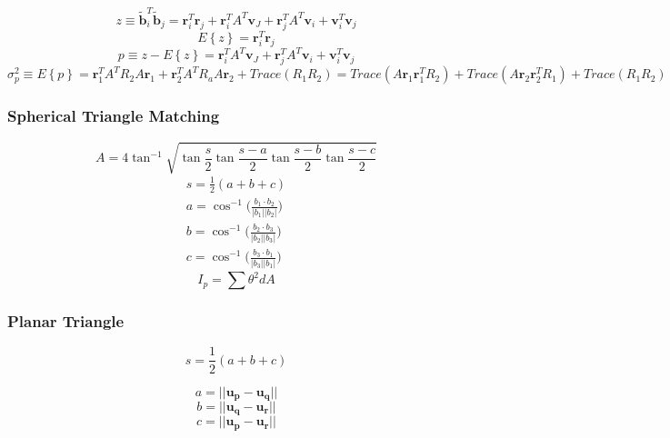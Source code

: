 \documentclass[12pt,a4paper,oneside]{article}
\begin{document}
\begin{equation}
z \equiv \tilde{\bm{b}}_i^T\tilde{\bm{b}}_j = \bm{r}_i^T\bm{r}_j + \bm{r}_i^TA^T\bm{v}_J + \bm{r}_j^TA^T\bm{v}_i + \bm{v}_i^T\bm{v}_j
\end{equation}
\begin{equation}
E\left\{z\right\} = \bm{r}_i^T\bm{r}_j
\end{equation}
\begin{equation}
p \equiv z - E\left\{z\right\} = \bm{r}_i^TA^T\bm{v}_J + \bm{r}_j^TA^T\bm{v}_i + \bm{v}_i^T\bm{v}_j
\end{equation}
\begin{equation}
\sigma_p^2 \equiv E\left\{p\right\} = \bm{r}_1^TA^TR_2A\bm{r}_1 + \bm{r}_2^TA^TR_aA\bm{r}_2 + Trace(R_1R_2) = Trace(A\bm{r}_1\bm{r}_1^TR_2) + Trace(A\bm{r}_2\bm{r}_2^TR_1) + Trace(R_1R_2)
\end{equation}
\subsubsection{Spherical Triangle Matching}
\cite{cole2004fast}

\begin{equation}
A = 4\tan^{-1}\sqrt{\tan\frac{s}{2}\tan\frac{s-a}{2}\tan\frac{s-b}{2}\tan\frac{s-c}{2}}
\end{equation}
\begin{subequations}
\begin{align*}
s = \frac{1}{2}(a + b + c) \\
a = \cos^{-1} \bigg(\frac{b_1 \cdot b_2}{|b_1||b_2|}\bigg) \\
b = \cos^{-1} \bigg(\frac{b_2 \cdot b_3}{|b_2||b_3|}\bigg) \\
c = \cos^{-1} \bigg(\frac{b_3 \cdot b_1}{|b_3||b_1|}\bigg) 
\end{align*}
\end{subequations}
\begin{equation}
I_p = \sum\theta^2dA
\end{equation}
\subsubsection{Planar Triangle}
\cite{cole2006fast}\par

\begin{equation}
s = \frac{1}{2}(a + b + c)
\end{equation}

\begin{equation}
a = ||\bm{u_p} - \bm{u_q}||
\end{equation}
\begin{equation}
b = ||\bm{u_q} - \bm{u_r}||
\end{equation}
\begin{equation}
c = ||\bm{u_p} - \bm{u_r}||
\end{equation}
\end{document}
